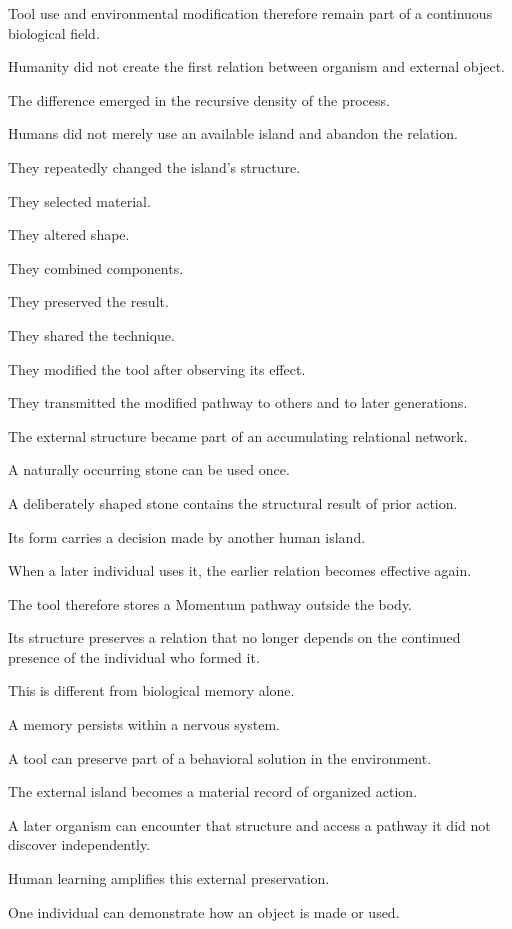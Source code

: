 Tool use and environmental modification therefore remain part of a continuous biological field.

Humanity did not create the first relation between organism and external object.

The difference emerged in the recursive density of the process.

Humans did not merely use an available island and abandon the relation.

They repeatedly changed the island’s structure.

They selected material.

They altered shape.

They combined components.

They preserved the result.

They shared the technique.

They modified the tool after observing its effect.

They transmitted the modified pathway to others and to later generations.

The external structure became part of an accumulating relational network.

A naturally occurring stone can be used once.

A deliberately shaped stone contains the structural result of prior action.

Its form carries a decision made by another human island.

When a later individual uses it, the earlier relation becomes effective again.

The tool therefore stores a Momentum pathway outside the body.

Its structure preserves a relation that no longer depends on the continued presence of the individual who formed it.

This is different from biological memory alone.

A memory persists within a nervous system.

A tool can preserve part of a behavioral solution in the environment.

The external island becomes a material record of organized action.

A later organism can encounter that structure and access a pathway it did not discover independently.

Human learning amplifies this external preservation.

One individual can demonstrate how an object is made or used.

